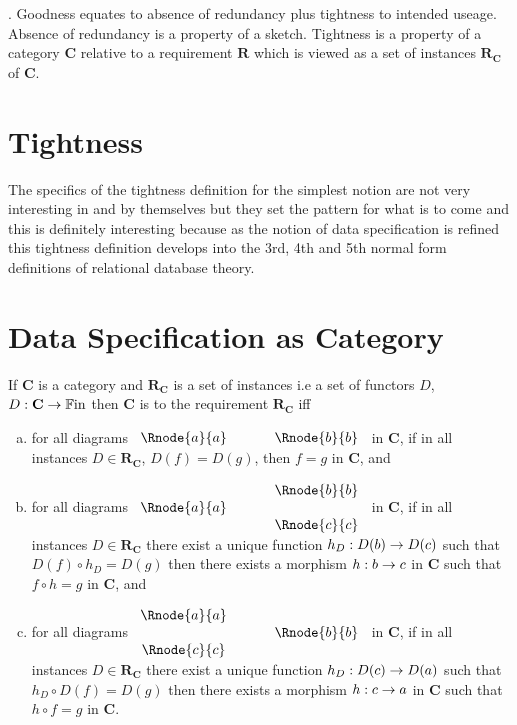 \documentclass[10pt,a4paper]{article}
\theoremstyle{remark}
\newcounter{para}
\newcommand\note{\par\refstepcounter{para}\thepara.\space}
\newcommand{\catc}[1][C]{\textbf{#1}}
\newcommand{\reqt}{\textbf{R}}
\newcommand{\reqtc}[1][\catc]{\reqt_{#1}}
\newcommand{\Fin}{\ensuremath{\mathbb{F\mathrm{in}} }}
\begin{document}
\note
Goodness equates to absence of redundancy plus tightness to intended useage. Absence of redundancy is a property of a sketch. Tightness
is a property of a category $\catc$ relative to a requirement $\reqt$ which is viewed as a set of instances $\reqtc$ of $\catc$.

\section*{Tightness}
The specifics of the tightness definition for the simplest notion  are not very interesting in and by themselves but they set the pattern for what is to come and this is definitely interesting because as the notion of data specification is refined this tightness definition develops into the 3rd, 4th and 5th normal form definitions of relational database theory.

\section{Data Specification as Category}
\begin{definition}
If $\catc$ is a category and $\reqtc$ is a set of instances i.e a set of functors $D$, $D: \catc \morph \Fin$ then $\catc$ is 
 to the requirement $\reqtc$ iff
\begin{enumerate}[(a)]
\item
for all diagrams
$
\begin{array}{c p{0.5cm} c  }
 \Rnode{a}{a}            &&   \Rnode{b}{b}
\end{array} 
$
in $\catc$,  if in all instances $D \in \reqtc$, $D(f)=D(g)$, 
then $f=g$ in $\catc$, and 
\item for all diagrams
$
\begin{array}{c p{0.5cm} c  }
             &&   \Rnode{b}{b} \\[0.01cm]
\Rnode{a}{a} &&                \\[0.01cm] 
             &&   \Rnode{c}{c}         
\end{array} 
$
in $\catc$, if in all instances $D \in \reqtc$ there exist a unique function $h_D : D(b) \rightarrow D(c)$ such that
$D(f) \circ h_D = D(g)$ then there exists a morphism $h:b \rightarrow c$ in $\catc$ such that $f \circ h = g$ in $\catc$, and
\item for all diagrams
$
\begin{array}{c p{0.5cm} c  }
\Rnode{a}{a} &&                \\[0.01cm] 
             &&   \Rnode{b}{b} \\[0.01cm]
\Rnode{c}{c}         
\end{array} 
$
in $\catc$, if in all instances $D \in \reqtc$ there exist a unique function $h_D : D(c) \rightarrow D(a)$ such that
$h_D \circ D(f) = D(g)$ then there exists a morphism $h:c \rightarrow a$ in $\catc$ such that $h \circ f = g$ in $\catc$.
\end{enumerate}
\end{definition}
\end{document}
